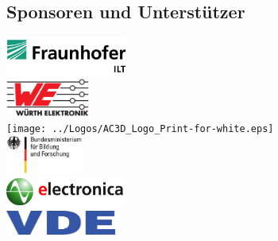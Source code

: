 \documentclass[a4paper,12pt,notumble]{leaflet}
\begin{document}
\noindent
\begin{minipage}[c][0.45\textheight][t]{\textwidth}
	\begin{center}
		\section{Sponsoren und Unterstützer}
		\vspace{0.7cm}
		\includegraphics[height=1.25cm]{../Logos/Fraunhofer_ILT_klein.png} \\ \vspace{0.3cm}
		\includegraphics[height=1.25cm]{../Logos/Wuerth.png} \\ \vspace{0.3cm}
		\texttt{[image: ../Logos/AC3D\_Logo\_Print-for-white.eps]} \\ \vspace{0.3cm}
		\includegraphics[height=1.25cm]{../Logos/BMBF.png} \\ \vspace{0.3cm}
		\includegraphics[height=1cm]{../Logos/electronica.png} \\ \vspace{0.3cm}
		\includegraphics[height=0.8cm]{../Logos/VDE.png}
	\end{center}
\end{minipage}
\end{document}
